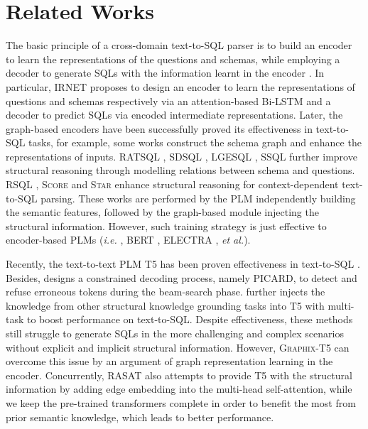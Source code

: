 \documentclass[letterpaper]{article} \usepackage{aaai23}  \usepackage{times}  \usepackage{helvet}  \usepackage{courier}  \usepackage[hyphens]{url}  \usepackage{graphicx} \usepackage{amsmath}
\newcommand{\graphix}{\textsc{Graphix}\xspace}
\def\etal{\emph{et al.}}
\def\ie{\emph{i.e. }}
\begin{document}
\section{Related Works}
The basic principle of a cross-domain text-to-SQL parser is to build an encoder to learn the representations of the questions and schemas, while employing a decoder to generate SQLs with the information learnt in the encoder \citep{t2s_survey}. In particular, IRNET \citep{irnet} proposes to design an encoder to learn the representations of questions and schemas respectively via an attention-based Bi-LSTM and a decoder to predict SQLs via encoded intermediate representations. 
Later, the graph-based encoders have been successfully proved its effectiveness in text-to-SQL tasks, for example, some works \citep{GNNSQL, chen-etal-2021-shadowgnn} construct the schema graph and enhance the representations of inputs. RATSQL \citep{wang-etal-2020-rat}, SDSQL \citep{sdsql}, LGESQL \citep{lgesql}, SSQL \citep{s2sql} further improve structural reasoning through modelling relations between schema and questions. RSQL \citep{r2sql}, \textsc{Score} \citep{score} and \textsc{Star} \citep{star} enhance structural reasoning for context-dependent text-to-SQL parsing.
These works are performed by the PLM independently building the semantic features, followed by the graph-based module injecting the structural information.
However, such training strategy is just effective to encoder-based PLMs (\ie, BERT \citep{devlin-etal-2019-bert}, ELECTRA \citep{electra-iclr-2020}, \etal).

Recently, the text-to-text PLM T5 has been proven effectiveness in text-to-SQL \citep{shaw-etal-2021-compositional, sun}. Besides, \citep{PICARD} designs a constrained decoding process, namely PICARD, to detect and refuse erroneous tokens during the beam-search phase.
\citet{UnifiedSKG} further injects the knowledge from other structural knowledge grounding tasks into T5 with multi-task to boost performance on text-to-SQL.  
Despite effectiveness, these methods still struggle to generate SQLs in the more challenging and complex scenarios without explicit and implicit structural information.
However, \graphix-T5 can overcome this issue by an argument of graph representation learning in the encoder. Concurrently, RASAT \citep{rasat} also attempts to provide T5 with the structural information by adding edge embedding into the multi-head self-attention, while we keep the pre-trained transformers complete in order to benefit the most from prior semantic knowledge, which leads to better performance.
\end{document}

